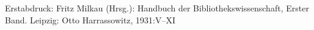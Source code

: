Erstabdruck: Fritz Milkau (Hrsg.): Handbuch der Bibliothekswissenschaft,
Erster Band. Leipzig: Otto Harrassowitz, 1931:V--XI